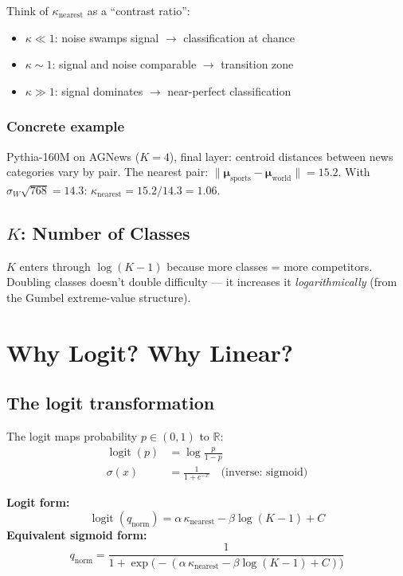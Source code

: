 \documentclass[11pt,a4paper]{article}
\DeclareMathOperator{\logit}{logit}
\begin{document}
Think of $\kappa_{\mathrm{nearest}}$ as a ``contrast ratio'':
\begin{itemize}[nosep]
\item $\kappa \ll 1$: noise swamps signal $\to$ classification at chance
\item $\kappa \sim 1$: signal and noise comparable $\to$ transition zone
\item $\kappa \gg 1$: signal dominates $\to$ near-perfect classification
\end{itemize}

\subsubsection{Concrete example}

Pythia-160M on AGNews ($K{=}4$), final layer: centroid distances between news categories vary by pair. The nearest pair: $\|\boldsymbol{\mu}_\mathrm{sports} - \boldsymbol{\mu}_\mathrm{world}\| = 15.2$. With $\sigma_W\sqrt{768} = 14.3$: $\kappa_\mathrm{nearest} = 15.2/14.3 = 1.06$.

\subsection{$K$: Number of Classes}

$K$ enters through $\log(K{-}1)$ because more classes = more competitors. Doubling classes doesn't double difficulty --- it increases it \emph{logarithmically} (from the Gumbel extreme-value structure).

\section{Why Logit? Why Linear?}

\subsection{The logit transformation}

The logit maps probability $p \in (0,1)$ to $\mathbb{R}$:
\begin{align}
\logit(p) &= \log\frac{p}{1-p} \\
\sigma(x) &= \frac{1}{1+e^{-x}} \quad \text{(inverse: sigmoid)}
\end{align}

\begin{derivbox}
\textbf{Logit form:}
\[
\logit(q_\mathrm{norm}) = \alpha\,\kappa_\mathrm{nearest} - \beta\log(K{-}1) + C
\]
\textbf{Equivalent sigmoid form:}
\[
q_\mathrm{norm} = \frac{1}{1 + \exp\!\bigl(-(\alpha\,\kappa_\mathrm{nearest} - \beta\log(K{-}1) + C)\bigr)}
\]
\end{derivbox}
\end{document}

